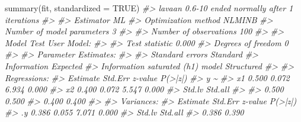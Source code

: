 \documentclass[
  11pt,
]{krantz}
\makeatletter
\newenvironment{Shaded}{\begin{snugshade}}{\end{snugshade}}
\newcommand{\AttributeTok}[1]{\textcolor[rgb]{0.61,0.61,0.61}{#1}}
\newcommand{\CommentTok}[1]{\textcolor[rgb]{0.37,0.37,0.37}{\textit{#1}}}
\newcommand{\ConstantTok}[1]{\textcolor[rgb]{0,0,0}{#1}}
\newcommand{\FunctionTok}[1]{\textcolor[rgb]{0,0,0}{#1}}
\newcommand{\NormalTok}[1]{#1}
\newenvironment{kframe}{%
\medskip{}
\setlength{\fboxsep}{.8em}
 \def\at@end@of@kframe{}%
 \ifinner\ifhmode%
  \def\at@end@of@kframe{\end{minipage}}%
  \begin{minipage}{\columnwidth}%
 \fi\fi%
 \def\FrameCommand##1{\hskip\@totalleftmargin \hskip-\fboxsep
 \colorbox{shadecolor}{##1}\hskip-\fboxsep
     \hskip-\linewidth \hskip-\@totalleftmargin \hskip\columnwidth}%
 \MakeFramed {\advance\hsize-\width
   \@totalleftmargin\z@ \linewidth\hsize
   \@setminipage}}%
 {\par\unskip\endMakeFramed%
 \at@end@of@kframe}
\renewenvironment{Shaded}{\begin{kframe}}{\end{kframe}}
\theoremstyle{definition}
\theoremstyle{definition}
\theoremstyle{definition}
\theoremstyle{definition}
\theoremstyle{remark}
\makeatother
\begin{document}
\begin{Shaded}
\begin{Highlighting}[]
\FunctionTok{summary}\NormalTok{(fit, }\AttributeTok{standardized =} \ConstantTok{TRUE}\NormalTok{)}
\CommentTok{\#\textgreater{} lavaan 0.6{-}10 ended normally after 1 iterations}
\CommentTok{\#\textgreater{} }
\CommentTok{\#\textgreater{}   Estimator                                         ML}
\CommentTok{\#\textgreater{}   Optimization method                           NLMINB}
\CommentTok{\#\textgreater{}   Number of model parameters                         3}
\CommentTok{\#\textgreater{}                                                       }
\CommentTok{\#\textgreater{}   Number of observations                           100}
\CommentTok{\#\textgreater{}                                                       }
\CommentTok{\#\textgreater{} Model Test User Model:}
\CommentTok{\#\textgreater{}                                                       }
\CommentTok{\#\textgreater{}   Test statistic                                 0.000}
\CommentTok{\#\textgreater{}   Degrees of freedom                                 0}
\CommentTok{\#\textgreater{} }
\CommentTok{\#\textgreater{} Parameter Estimates:}
\CommentTok{\#\textgreater{} }
\CommentTok{\#\textgreater{}   Standard errors                             Standard}
\CommentTok{\#\textgreater{}   Information                                 Expected}
\CommentTok{\#\textgreater{}   Information saturated (h1) model          Structured}
\CommentTok{\#\textgreater{} }
\CommentTok{\#\textgreater{} Regressions:}
\CommentTok{\#\textgreater{}                    Estimate  Std.Err  z{-}value  P(\textgreater{}|z|)}
\CommentTok{\#\textgreater{}   y \textasciitilde{}                                                 }
\CommentTok{\#\textgreater{}     x1                0.500    0.072    6.934    0.000}
\CommentTok{\#\textgreater{}     x2                0.400    0.072    5.547    0.000}
\CommentTok{\#\textgreater{}    Std.lv  Std.all}
\CommentTok{\#\textgreater{}                   }
\CommentTok{\#\textgreater{}     0.500    0.500}
\CommentTok{\#\textgreater{}     0.400    0.400}
\CommentTok{\#\textgreater{} }
\CommentTok{\#\textgreater{} Variances:}
\CommentTok{\#\textgreater{}                    Estimate  Std.Err  z{-}value  P(\textgreater{}|z|)}
\CommentTok{\#\textgreater{}    .y                 0.386    0.055    7.071    0.000}
\CommentTok{\#\textgreater{}    Std.lv  Std.all}
\CommentTok{\#\textgreater{}     0.386    0.390}
\end{Highlighting}
\end{Shaded}
\end{document}
